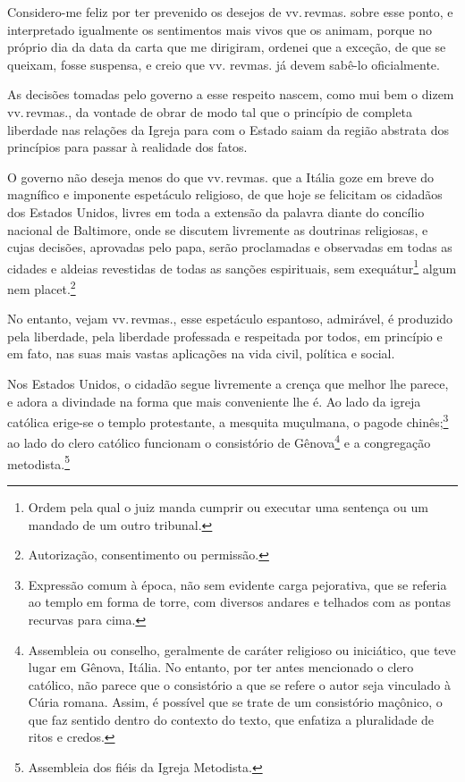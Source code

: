 Considero-me feliz por ter prevenido os desejos de vv.\,revmas. sobre
esse ponto, e interpretado igualmente os sentimentos mais vivos que os
animam, porque no próprio dia da data da carta que me dirigiram, ordenei
que a exceção, de que se queixam, fosse suspensa, e creio que vv.
revmas. já devem sabê-lo oficialmente.

As decisões tomadas pelo governo a esse respeito nascem, como mui bem o
dizem vv.\,revmas., da vontade de obrar de modo tal que o princípio de
completa liberdade nas relações da Igreja para com o Estado saiam da
região abstrata dos princípios para passar à realidade dos fatos.

O governo não deseja menos do que vv.\,revmas. que a Itália goze em breve
do magnífico e imponente espetáculo religioso, de que hoje se felicitam
os cidadãos dos Estados Unidos, livres em toda a extensão da palavra
diante do concílio nacional de Baltimore, onde se discutem livremente as
doutrinas religiosas, e cujas decisões, aprovadas pelo papa, serão
proclamadas e observadas em todas as cidades e aldeias revestidas de
todas as sanções espirituais, sem exequátur\footnote{Ordem pela qual o
  juiz manda cumprir ou executar uma sentença ou um mandado de um outro
  tribunal.} algum nem placet.\footnote{Autorização, consentimento ou
  permissão.}

No entanto, vejam vv.\,revmas., esse espetáculo espantoso, admirável, é
produzido pela liberdade, pela liberdade professada e respeitada por
todos, em princípio e em fato, nas suas mais vastas aplicações na vida
civil, política e social.

Nos Estados Unidos, o cidadão segue livremente a crença que melhor lhe
parece, e adora a divindade na forma que mais conveniente lhe é. Ao lado
da igreja católica erige-se o templo protestante, a mesquita muçulmana,
o pagode chinês;\footnote{Expressão comum à época, não sem evidente
  carga pejorativa, que se referia ao templo em forma de torre, com
  diversos andares e telhados com as pontas recurvas para cima.} ao
lado do clero católico funcionam o consistório de Gênova\footnote{
  Assembleia ou conselho, geralmente de caráter religioso ou iniciático,
  que teve lugar em Gênova, Itália. No entanto, por ter antes mencionado
  o clero católico, não parece que o consistório a que se refere o autor
  seja vinculado à Cúria romana. Assim, é possível que se trate de um
  consistório maçônico, o que faz sentido dentro do contexto do texto,
  que enfatiza a pluralidade de ritos e credos.} e a congregação
metodista.\footnote{Assembleia dos fiéis da Igreja Metodista.}


